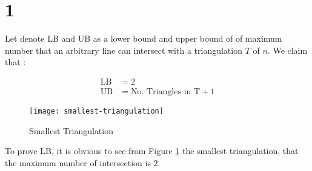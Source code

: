 
\section*{1}

Let denote LB and UB as a lower bound and upper bound of
of maximum number that an arbitrary line can intersect with a
triangulation $T$ of $n$. We claim that :

\begin{align*}
    \mathrm{LB} &= 2\\
    \mathrm{UB} &= \text{No. Triangles in T} + 1
\end{align*}
\begin{figure}[h]
    \begin{center}
        \texttt{[image: smallest-triangulation]}
        \caption{Smallest Triangulation}
        \label{fig:smallest-triangulation}
    \end{center}
\end{figure}

To prove LB, it is obvious to see from Figure \ref{fig:smallest-triangulation}
the smallest triangulation, that the maximum number of intersection is $2$.
